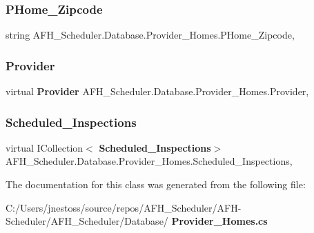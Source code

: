 \mbox{\label{class_a_f_h___scheduler_1_1_database_1_1_provider___homes_a86aa90d032b68e1e3318be284253b4ea}} 
\subsubsection{PHome\_Zipcode}
{\footnotesize\ttfamily string A\+F\+H\+\_\+\+Scheduler.\+Database.\+Provider\+\_\+\+Homes.\+P\+Home\+\_\+\+Zipcode\hspace{0.3cm}{\ttfamily [get]}, {\ttfamily [set]}}

\mbox{\label{class_a_f_h___scheduler_1_1_database_1_1_provider___homes_a38ef4b353d7453fea775c96029de68e7}} 
\subsubsection{Provider}
{\footnotesize\ttfamily virtual \textbf{ Provider} A\+F\+H\+\_\+\+Scheduler.\+Database.\+Provider\+\_\+\+Homes.\+Provider\hspace{0.3cm}{\ttfamily [get]}, {\ttfamily [set]}}

\mbox{\label{class_a_f_h___scheduler_1_1_database_1_1_provider___homes_a5937a1cc8ba11911292f85c0260b343a}} 
\subsubsection{Scheduled\_Inspections}
{\footnotesize\ttfamily virtual I\+Collection$<$\textbf{ Scheduled\+\_\+\+Inspections}$>$ A\+F\+H\+\_\+\+Scheduler.\+Database.\+Provider\+\_\+\+Homes.\+Scheduled\+\_\+\+Inspections\hspace{0.3cm}{\ttfamily [get]}, {\ttfamily [set]}}



The documentation for this class was generated from the following file\+:\begin{DoxyCompactItemize}
\item 
C\+:/\+Users/jnestoss/source/repos/\+A\+F\+H\+\_\+\+Scheduler/\+A\+F\+H-\/\+Scheduler/\+A\+F\+H\+\_\+\+Scheduler/\+Database/\textbf{ Provider\+\_\+\+Homes.\+cs}\end{DoxyCompactItemize}
